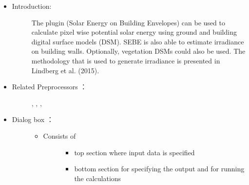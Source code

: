 \documentclass[letterpaper,10pt,english]{sphinxmanual}
\begin{document}
\begin{itemize}
\item {} \begin{description}
\item[{Introduction:}] \leavevmode
The  plugin (Solar Energy on Building Envelopes) can be used to calculate pixel wise potential solar energy using ground and building digital surface models (DSM). SEBE is also able to estimate irradiance on building walls. Optionally, vegetation DSMs could also be used. The methodology that is used to generate irradiance is presented in Lindberg et al. (2015).

\end{description}

\item {} \begin{description}
\item[{Related Preprocessors ：}] \leavevmode
{\hyperref[\detokenize{pre-processor/Meteorological Data MetPreprocessor:metpreprocessor}]{}}, {\hyperref[\detokenize{pre-processor/Meteorological Data Download data (WATCH):watch}]{}}, {\hyperref[\detokenize{pre-processor/Urban Geometry Wall Height and Aspect:wallheightandaspect}]{}}, {\hyperref[\detokenize{pre-processor/Urban Land Cover Land Cover Reclassifier:landcoverreclassifier}]{}}

\end{description}

\item {} \begin{description}
\item[{Dialog box ：}] \leavevmode\begin{itemize}
\item {} \begin{description}
\item[{Consists of}] \leavevmode\begin{itemize}
\item {} 
top section where input data is specified

\item {} 
bottom section for specifying the output and for running the calculations

\end{itemize}

\end{description}

\end{itemize}

\end{description}

\end{itemize}
\end{document}
